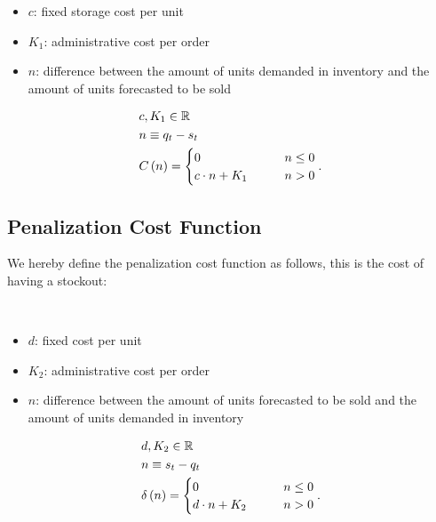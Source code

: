 \documentclass{OptiFlow}
\begin{document}
\hfill\begin{minipage}{\dimexpr0.5\textwidth-1cm}
	\begin{itemize}
	\item $c$: fixed storage cost per unit
	\item $K_1$: administrative cost per order
	\item $n$: difference between the amount of units demanded in inventory and the amount of units forecasted to be sold
\end{itemize}
\end{minipage}


\begin{align*}
	&c, K_1 \in \mathbb{R}\\
	&n \equiv q_t - s_t\\
	&C\left( n \right) =  \begin{cases}
		0 \text{\qquad} &n \le  0\\
		c\cdot n +K_1 \text{\qquad} &n>0
	\end{cases}  
.\end{align*}

\subsection{Penalization Cost Function}
We hereby define the penalization cost function as follows, this is the cost of having a stockout:

$\text{ }$

\hfill\begin{minipage}{\dimexpr0.5\textwidth-1cm}
\begin{itemize}
	\item $d$: fixed cost per unit
	\item $K_2$: administrative cost per order
	\item $n$: difference between the amount of units forecasted to be sold and the amount of units demanded in inventory
\end{itemize}
\end{minipage}

\begin{align*}
	&d,K_2 \in  \mathbb{R}\\
	&n \equiv s_t - q_t\\
	&\delta\left( n \right) = \begin{cases}
		0 \text{\qquad} &n \le  0\\
		d\cdot n + K_2 \text{\qquad} &n > 0
	\end{cases}
.\end{align*}
\end{document}
